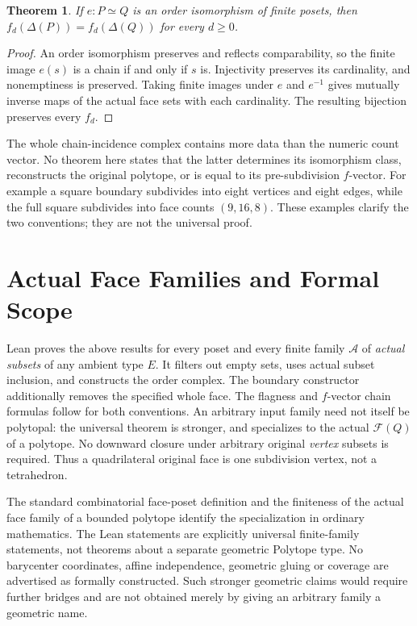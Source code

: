 \documentclass[11pt]{article}
\newtheorem{theorem}{Theorem}
\newcommand{\D}{\Delta}
\begin{document}
\begin{theorem}
If $e:P\simeq Q$ is an order isomorphism of finite posets, then
$f_d(\D(P))=f_d(\D(Q))$ for every $d\ge0$.
\end{theorem}
\begin{proof}
An order isomorphism preserves and reflects comparability, so the finite image
$e(s)$ is a chain if and only if $s$ is. Injectivity preserves its cardinality,
and nonemptiness is preserved. Taking finite images under $e$ and $e^{-1}$
gives mutually inverse maps of the actual face sets with each cardinality.
The resulting bijection preserves every $f_d$.
\end{proof}

The whole chain-incidence complex contains more data than the numeric count
vector. No theorem here states that the latter determines its isomorphism
class, reconstructs the original polytope, or is equal to its pre-subdivision
$f$-vector. For example a square boundary subdivides into eight vertices and
eight edges, while the full square subdivides into face counts $(9,16,8)$.
These examples clarify the two conventions; they are not the universal proof.

\section{Actual Face Families and Formal Scope}
Lean proves the above results for every poset and every finite family
$\mathcal A$ of \emph{actual subsets} of any ambient type $E$. It filters out
empty sets, uses actual subset inclusion, and constructs the order complex.
The boundary constructor additionally removes the specified whole face.
The flagness and $f$-vector chain formulas follow for both conventions. An
arbitrary input family need not itself be polytopal: the universal theorem
is stronger, and specializes to the actual $\mathcal F(Q)$ of a polytope.
No downward closure under arbitrary original \emph{vertex} subsets is required.
Thus a quadrilateral original face is one subdivision vertex, not a tetrahedron.

The standard combinatorial face-poset definition and the finiteness of the
actual face family of a bounded polytope identify the specialization in ordinary
mathematics. The Lean statements are explicitly universal finite-family
statements, not theorems about a separate geometric Polytope type. No barycenter
coordinates, affine independence, geometric gluing or coverage are advertised
as formally constructed. Such stronger geometric claims would require further
bridges and are not obtained merely by giving an arbitrary family a geometric name.
\end{document}
